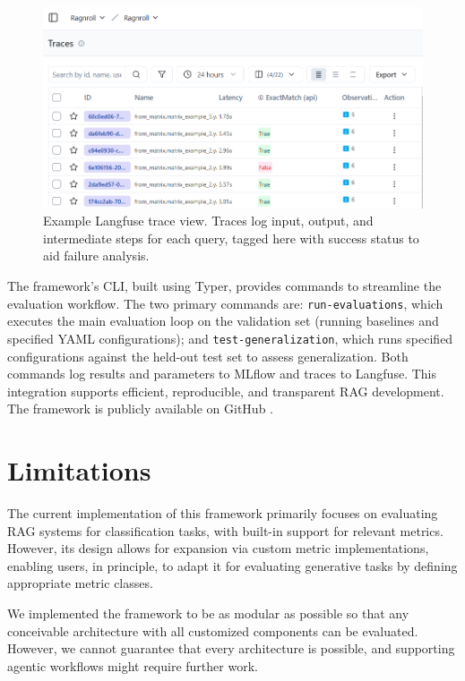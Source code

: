 \begin{figure}[!ht]
\centering
\includegraphics[width=\textwidth]{images/langfuse.png}
\caption{Example Langfuse trace view. Traces log input, output, and intermediate steps for each query, tagged here with success status to aid failure analysis.}
\label{fig:langfuse}
\end{figure}

The framework's CLI, built using Typer, provides commands to streamline the evaluation workflow. The two primary commands are: \texttt{run-evaluations}, which executes the main evaluation loop on the validation set (running baselines and specified YAML configurations); and \texttt{test-generalization}, which runs specified configurations against the held-out test set to assess generalization. Both commands log results and parameters to MLflow and traces to Langfuse. This integration supports efficient, reproducible, and transparent RAG development. The framework is publicly available on GitHub \cite{albrecht-2025}.

\section{Limitations}

The current implementation of this framework primarily focuses on evaluating RAG systems for classification tasks, with built-in support for relevant metrics. However, its design allows for expansion via custom metric implementations, enabling users, in principle, to adapt it for evaluating generative tasks by defining appropriate metric classes.

We implemented the framework to be as modular as possible so that any conceivable architecture with all customized components can be evaluated. However, we cannot guarantee that every architecture is possible, and supporting agentic workflows might require further work.


